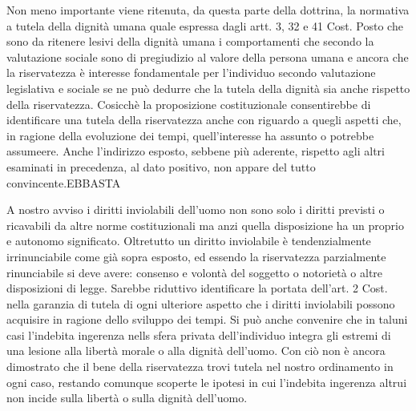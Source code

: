 Non meno importante viene ritenuta, da questa parte della dottrina, la normativa a tutela della dignità umana quale espressa dagli artt. 3, 32 e 41 Cost. Posto che sono da ritenere lesivi della dignità umana i comportamenti che secondo la valutazione sociale sono di pregiudizio al valore della persona umana e ancora che la riservatezza è interesse fondamentale per l'individuo secondo valutazione legislativa e sociale se ne può dedurre che la tutela della dignità sia anche rispetto della riservatezza.
Cosicchè la proposizione costituzionale consentirebbe di identificare una tutela della riservatezza anche con riguardo a quegli aspetti che, in ragione della evoluzione dei tempi, quell'interesse ha assunto o potrebbe assumeere. Anche l'indirizzo esposto, sebbene più aderente, rispetto agli altri esaminati in precedenza, al dato positivo, non appare del tutto convincente.EBBASTA

A nostro avviso i diritti inviolabili dell'uomo non sono solo i diritti previsti o ricavabili da altre norme costituzionali ma anzi quella disposizione ha un proprio e autonomo significato.
Oltretutto un diritto inviolabile è tendenzialmente irrinunciabile come già sopra esposto, ed essendo la riservatezza parzialmente rinunciabile si deve avere: consenso e volontà del soggetto o notorietà o altre disposizioni di legge.
Sarebbe riduttivo identificare la portata dell'art. 2 Cost. nella garanzia di tutela di ogni ulteriore aspetto che i diritti inviolabili possono acquisire in ragione dello sviluppo dei tempi. Si può anche convenire che in taluni casi l'indebita ingerenza nells sfera privata dell'individuo integra gli estremi di una lesione alla libertà morale o alla dignità dell'uomo.
Con ciò non è ancora dimostrato che il bene della riservatezza trovi tutela nel nostro ordinamento in ogni caso, restando comunque scoperte le ipotesi in cui l'indebita ingerenza altrui non incide sulla libertà o sulla dignità dell'uomo.

